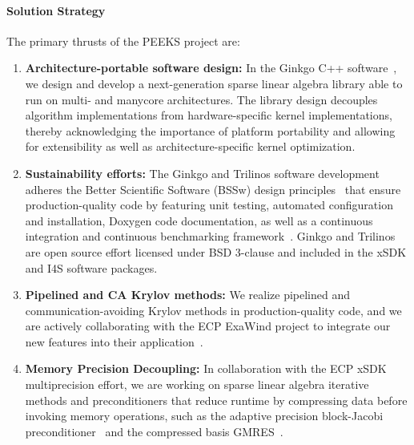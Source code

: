 \paragraph{Solution Strategy}

The primary thrusts of the PEEKS project are:
\begin{enumerate}
    \item \textbf{Architecture-portable software design:}
	In the Ginkgo C++ software~\cite{anzt2020ginkgo}, we design and develop a 
	next-generation 
	sparse linear algebra library able to run on multi- and manycore 
	architectures. The library design decouples
	algorithm implementations from hardware-specific kernel implementations, 
	thereby acknowledging the importance of platform portability and allowing 
	for extensibility as well as architecture-specific kernel optimization. 
   \item \textbf{Sustainability efforts:}
	The Ginkgo and Trilinos software development adheres the Better Scientific 
	Software (BSSw) design principles~\cite{betterscientificsoftware} that 
	ensure production-quality code by featuring unit testing, automated 
	configuration and installation, Doxygen code documentation, as well as a 
	continuous integration and continuous benchmarking 
	framework~\cite{pasc_anzt}. Ginkgo and Trilinos are 
	open source effort licensed under BSD 3-clause and included in the xSDK and 
	I4S software packages.
   \item \textbf{Pipelined and CA Krylov methods:} 
    	We realize pipelined and 
	communication-avoiding Krylov methods in production-quality code, and 
	we are actively collaborating with the ECP ExaWind project to integrate 
        our new features into their application~\cite{Yamazaki-lowsynch}. 
	\item \textbf{Memory Precision Decoupling:}  In collaboration with the ECP 
	xSDK multiprecision effort, we are working on sparse linear algebra 
	iterative methods and preconditioners that reduce runtime by compressing 
	data before invoking memory operations, such as the adaptive precision 
	block-Jacobi preconditioner~\cite{toms_anzt} and the compressed basis 
	GMRES~\cite{aliaga2020compressed}. 
\end{enumerate}

